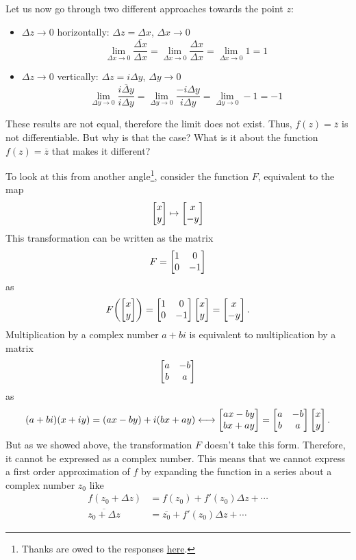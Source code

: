 \documentclass[10pt]{scrartcl}
\numberwithin{equation}{subsection}
\theoremstyle{definition}
\theoremstyle{remark}
\newcommand*{\conjugate}[1]{\overline{#1}}
\begin{document}
Let us now go through two different approaches towards the point $z$:
\begin{itemize}
	\item $\Delta z \to 0$ horizontally: $\Delta z = \Delta x$, $\Delta x \to 0$
		\[
			\lim_{\Delta x \to 0} \frac{\conjugate{\Delta x}}{\Delta x} = 
			\lim_{\Delta x \to 0} \frac{\Delta x}{\Delta x} = \lim_{\Delta x \to 0} 1 = 1
		\] 
	\item $\Delta z \to 0$ vertically: $\Delta z = i\Delta y$, $\Delta y \to 0$
		\[
			\lim_{\Delta y \to 0} \frac{\conjugate{i \Delta y}}{i \Delta y} = 
			\lim_{\Delta y \to 0} \frac{- i\Delta y}{i\Delta y} = \lim_{\Delta y \to 0}-1 = -1
		\]
\end{itemize}
These results are not equal, therefore the limit does not exist. Thus,
$f(z)=\conjugate{z}$ is not differentiable.
But why is that the case? What is it about the function
$f(z)=\conjugate{z}$ that makes it different?

To look at this from another angle\footnote{Thanks are
	owed to the responses
\href{http://math.stackexchange.com/questions/180849/why-is-the-complex-number-z-abi-equivalent-to-the-matrix-form-left-begins}{here}.},
consider the function
$F$, equivalent to the map
\[
	\bmqty{x \\ y} \mapsto \bmqty{x \\  -y} 
\] 
This transformation can be written as the matrix
\[
	F = \bmqty{1 & 0 \\ 0 & -1}
\]
as
\[
	F\pqty{\bmqty{x \\ y} }= \bmqty{1 & 0 \\ 0 & -1} \bmqty{x \\ y}  =
	\bmqty{x \\ -y}.
\]
Multiplication by a complex number $a + bi$ is equivalent
to multiplication by a matrix
\[
	\bmqty{a & -b \\ b & a}
\]
as
\[
	(a + bi) (x + iy) = (ax - by) + i(bx + ay) \longleftrightarrow
	\bmqty{ax - by \\ bx + ay} = \bmqty{a & -b \\ b & a} \bmqty{x \\ y}.
\]
But as we showed above, the transformation $F$ doesn't take this form.
Therefore, it cannot be expressed as a complex number. This means that we
cannot express a first order approximation of $f$ by expanding the function in a 
series about a complex number $z_0$ like
\begin{align*}
	f(z_0+\Delta z) &= f(z_0) + f'(z_0)\Delta z + \cdots \\	
	\conjugate{z_0 + \Delta z} &= \conjugate{z_0} + f'(z_0)\Delta z + \cdots
\end{align*}
\end{document}
